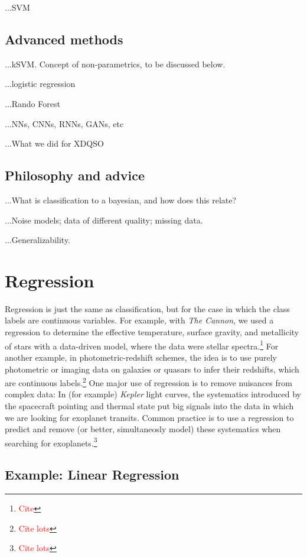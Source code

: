 \documentclass[12pt, twoside, letterpaper]{article}
\newcommand{\project}[1]{\textsl{#1}}
\newcommand{\todo}[1]{\textcolor{red}{#1}}  %
\begin{document}
...SVM

\subsection{Advanced methods}

...kSVM. Concept of non-parametrics, to be discussed below.

...logistic regression

...Rando Forest

...NNs, CNNs, RNNs, GANs, etc

...What we did for XDQSO

\subsection{Philosophy and advice}

...What is classification to a bayesian, and how does this relate?

...Noise models; data of different quality; missing data.

...Generalizability.

\section{Regression}

Regression is just the same as classification, but for the case
in which the class labels are continuous variables.
For example, with \project{The Cannon}, we used a regression
to determine the effective temperature, surface gravity, and
metallicity of stars with a data-driven model, where the data
were stellar spectra.\footnote{\todo{Cite}}
For another example, in photometric-redshift schemes, the idea
is to use purely photometric or imaging data on galaxies or quasars
to infer their redshifts,
which are continuous labels.\footnote{\todo{Cite lots}}
One major use of regression is to remove nuisances from complex
data:
In (for example) \project{Kepler} light curves, the systematics
introduced by the spacecraft pointing and thermal state put
big signals into the data in which we are looking for exoplanet
transits.
Common practice is to use a regression to predict and remove
(or better, simultaneosly model) these systematics when searching
for exoplanets.\footnote{\todo{Cite lots}}

\subsection{Example: Linear Regression}
\end{document}
